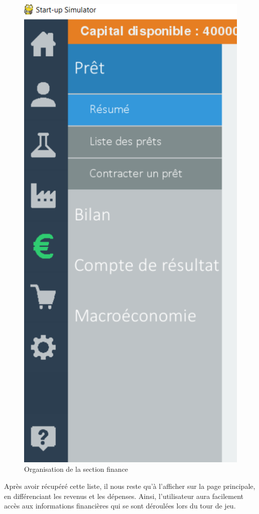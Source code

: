\begin{figure}[!htb]
\centering
\includegraphics[scale=1]{img/menu.png}
\caption{Organisation de la section finance}
\end{figure}

Après avoir récupéré cette liste, il nous reste qu’à l’afficher sur la page principale, en différenciant les revenus et les dépenses.
Ainsi, l’utilisateur aura facilement accès aux informations financières qui se sont déroulées lors du tour de jeu.



